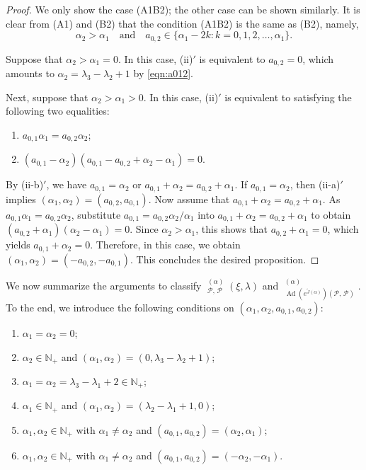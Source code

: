 \documentclass[a4paper,11pt,reqno]{amsart}
\newcommand{\calP}{\mathcal{P}}
\newcommand{\0}{{\bf 0}}
\newcommand{\N}{\mathbb{N}}
\newcommand{\1}{{\bf 1}}
\DeclareMathOperator{\Ad}{Ad}
\DeclareMathOperator{\Sol}{Sol}
\newcommand{\wJ}{\widetilde{J}}
\DeclareMathOperator{\wSol}{\widetilde{\Sol}}
\theoremstyle{plain}
\theoremstyle{definition}
\numberwithin{equation}{section}
\theoremstyle{definition}
\begin{document}
\begin{proof}
We only show the case (A1B2); 
the other case can be shown similarly.
It is clear from (A1) and (B2) that the condition (A1B2) is the same as (B2), namely,
\begin{equation}\label{eqn:B2}
\alpha_2 > \alpha_1
\quad \text{and} \quad
 a_{0,2} \in \{\alpha_1-2k:k=0,1,2,\ldots, \alpha_1\}.
\end{equation}

Suppose that $\alpha_2 > \alpha_1=0$. In this case, (ii)$'$ is 
equivalent to $a_{0,2}=0$, which amounts to 
$\alpha_2=\lambda_3-\lambda_2+1$ by \eqref{eqn:a012}.

Next, suppose that $\alpha_2 > \alpha_1 > 0$.
In this case, (ii)$'$ is equivalent to satisfying the following two equalities:
\begin{enumerate}
\item[\textnormal{(ii-a)}$'$]
$a_{0,1}\alpha_1=a_{0,2}\alpha_2$;
\item[\textnormal{(ii-b)}$'$] 
$(a_{0,1}-\alpha_2)(a_{0,1}-a_{0,2}+\alpha_2-\alpha_1)=0$.
\end{enumerate}
By (ii-b)$'$, we have $a_{0,1}=\alpha_2$ or 
$a_{0,1}+\alpha_2=a_{0,2}+\alpha_1$.
If $a_{0,1}=\alpha_2$, then (ii-a)$'$ implies
$(\alpha_1,\alpha_2) = (a_{0,2}, a_{0,1})$.
Now assume that $a_{0,1}+\alpha_2=a_{0,2}+\alpha_1$.
As $a_{0,1}\alpha_1=a_{0,2}\alpha_2$, substitute 
$a_{0,1}=a_{0,2}\alpha_2/\alpha_1$ into 
$a_{0,1}+\alpha_2=a_{0,2}+\alpha_1$ to obtain 
$(a_{0,2}+\alpha_1)(\alpha_2-\alpha_1)=0$.
Since $\alpha_2>\alpha_1$, this shows that $a_{0,2}+\alpha_1=0$,
which yields $a_{0,1}+\alpha_2=0$. 
Therefore, in this case,
we obtain $(\alpha_1,\alpha_2)=(-a_{0,2},-a_{0,1})$.
This concludes the desired proposition.
\end{proof}

We now summarize the arguments to classify 
$\wSol_{\calP,\, \calP}^{(\alpha)}(\xi,\lambda)$
and 
$\wSol_{\Ad(e^{\wJ(\alpha)})(\calP,\, \calP)}^{(\alpha)}$.
To the end,
we introduce the following conditions on $(\alpha_1, \alpha_2, a_{0,1}, a_{0,2})$:
\begin{enumerate}[label=\normalfont{(\arabic*)}]
\item[(D0)] 
$\alpha_1=\alpha_2=0$;
\vspace{5pt}
\item[(D1)] 
$\alpha_2 \in \N_+$ and 
$(\alpha_1,\alpha_2)=(0,\lambda_3-\lambda_2+1)$;
\vspace{5pt}
\item[(D2)] 
$\alpha_1=\alpha_2=\lambda_3-\lambda_1+2 \in\N_+$;
\vspace{5pt}
\item[(D3)] 
$\alpha_1 \in \N_+$ and 
$(\alpha_1,\alpha_2)=(\lambda_2-\lambda_1+1,0)$;
\vspace{5pt}
\item[(D4)] 
$\alpha_1, \alpha_2 \in \N_+$ with $\alpha_1\neq \alpha_2$ and 
$(a_{0,1},a_{0,2})=(\alpha_2,\alpha_1)$;
\vspace{5pt}
\item[(D5)] 
$\alpha_1, \alpha_2 \in \N_+$ with $\alpha_1\neq \alpha_2$ 
and
$(a_{0,1},a_{0,2})=(-\alpha_2,-\alpha_1)$.
\end{enumerate}
\end{document}
